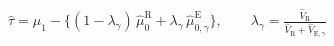 \documentclass[border=8pt]{standalone}
\begin{document}
$\displaystyle \widehat\tau=\widehat\mu_1-\big\{(1-\lambda_\gamma)\,\widehat\mu_0^{\mathrm{R}}+\lambda_\gamma\,\widehat\mu_{0,\gamma}^{\mathrm{E}}\big\},\qquad \lambda_\gamma=\frac{\widehat V_{\mathrm{R}}}{\widehat V_{\mathrm{R}}+\widehat V_{\mathrm{E},\gamma}}$
\end{document}
